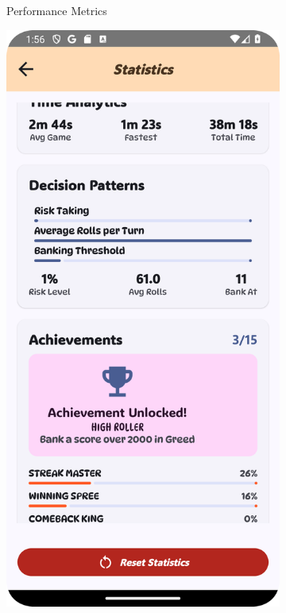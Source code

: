 \begin{figure}[h]
\begin{subfigure}[b]{0.27\textwidth}
        \caption{Performance Metrics}
    \end{subfigure}
    \hfill
    \begin{subfigure}[b]{0.27\textwidth}
        \includegraphics[width=\textwidth]{img/statistics screen3.png}

\end{subfigure}
\end{figure}
